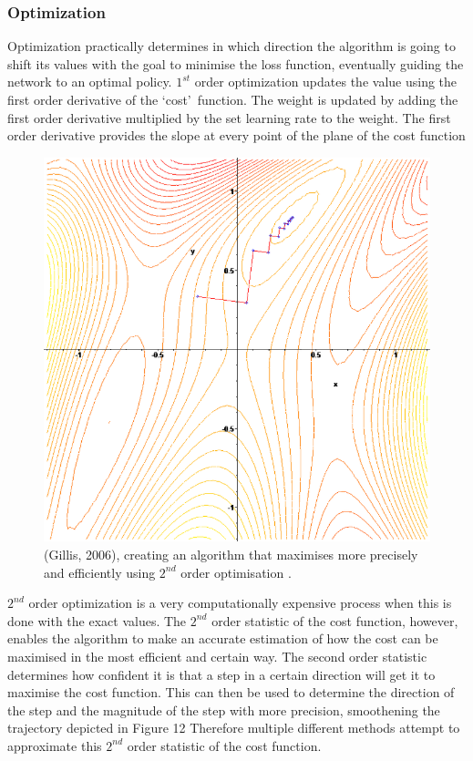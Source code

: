 \subsubsection*{Optimization} 
Optimization practically determines in which direction the algorithm is going to shift its values with the goal to minimise the loss function, eventually guiding the network to an optimal policy.
$1^{st}$ order optimization updates the value using the first order derivative of the \lq cost\rq \ function. The weight is updated by adding the first order derivative multiplied by the set learning rate to the weight. The first order derivative provides the slope at every point of the plane of the cost function
\begin{figure}
	\includegraphics[width=\columnwidth]{fig12.png} 
	\caption{(Gillis, 2006), creating an algorithm that maximises more precisely and  efficiently using $2^{nd}$ order optimisation .}
\end{figure}
$2^{nd}$ order optimization is a very computationally expensive process when this is done with the exact values. The $2^{nd}$ order statistic of the cost function, however, enables the algorithm to make an accurate estimation of how the cost can be maximised in the most efficient and certain way. The second order statistic determines how confident it is that a step in a certain direction will get it to maximise the cost function. This can then be used to determine the direction of the step and the magnitude of the step with more precision, smoothening the trajectory depicted in Figure 12  Therefore multiple different methods attempt to approximate this $2^{nd}$ order statistic of the cost function. 

